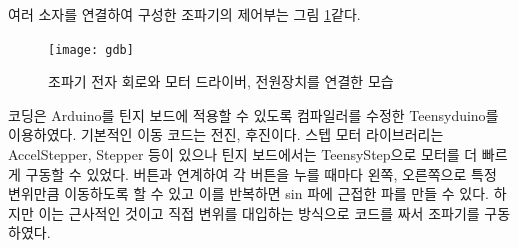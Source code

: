 여러 소자를 연결하여 구성한 조파기의 제어부는 그림 \ref{Wavemaker}\와 같다.

\begin{figure}[H]
	\begin{center}
		\texttt{[image: gdb]}
		\caption{조파기 전자 회로와 모터 드라이버, 전원장치를 연결한 모습}
		\label{Wavemaker}
	\end{center}
\end{figure}


코딩은 Arduino를 틴지 보드에 적용할 수 있도록 컴파일러를 수정한 Teensyduino를 이용하였다. 기본적인 이동 코드는 전진, 후진이다. 스텝 모터 라이브러리는 AccelStepper, Stepper 등이 있으나 틴지 보드에서는 TeensyStep으로 모터를 더 빠르게 구동할 수 있었다. 버튼과 연계하여 각 버튼을 누를 때마다 왼쪽, 오른쪽으로 특정 변위만큼 이동하도록 할 수 있고 이를 반복하면 sin 파에 근접한 파를 만들 수 있다. 하지만 이는 근사적인 것이고 직접 변위를 대입하는 방식으로 코드를 짜서 조파기를 구동하였다.



